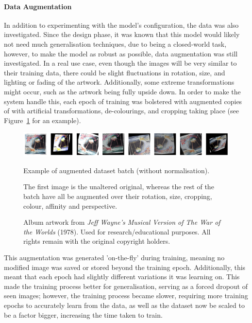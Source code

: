                     \paragraph{Data Augmentation}
        
                        In addition to experimenting with the model's configuration, the data was also investigated. Since the design phase, it was known that this model would likely not need much generalisation techniques, due to being a closed-world task, however, to make the model as robust as possible, data augmentation was still investigated. In a real use case, even though the images will be very similar to their training data, there could be slight fluctuations in rotation, size, and lighting or fading of the artwork. Additionally, some extreme transformations might occur, such as the artwork being fully upside down. In order to make the system handle this, each epoch of training was bolstered with augmented copies of with artificial transformations, de-colourings, and cropping taking place (see Figure~\ref{fig:augmentedArts} for an example).
    
                        \begin{figure}[h]
                            \centering
                            \includegraphics[width=\textwidth]{images/AugmentedArts.png}
                            \caption{Example of augmented dataset batch (without normalisation).}
                            \label{fig:augmentedArts}
                            \caption*{
                                The first image is the unaltered original, whereas the rest of the batch have all be augmented over their rotation, size, cropping, colour, affinity and perspective.
                            }
                            \caption*{
                                Album artwork from \textit{Jeff Wayne's Musical Version of The War of the Worlds} (1978).  
                                \footnotesize Used for research/educational purposes. All rights remain with the original copyright holders.
                            }
                        \end{figure}
    
                        This augmentation was generated 'on-the-fly' during training, meaning no modified image was saved or stored beyond the training epoch. Additionally, this meant that each epoch had slightly different variations it was learning on. This made the training process better for generalisation, serving as a forced dropout of seen images; however, the training process became slower, requiring more training epochs to accurately learn from the data, as well as the dataset now be scaled to be a factor bigger, increasing the time taken to train.
    

